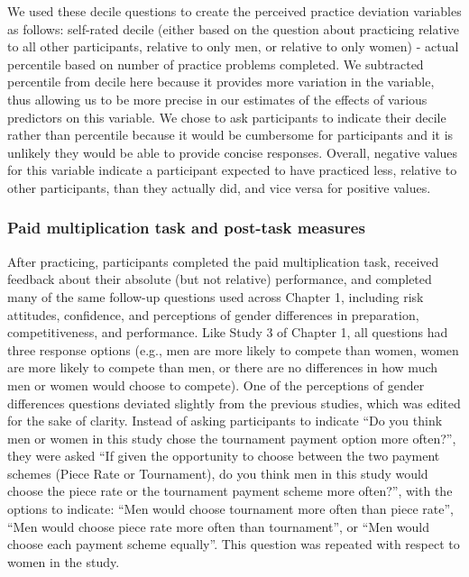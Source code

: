 \documentclass[a4paper, nobind]{templates/ociamthesis}
\begin{document}
We used these decile questions to create the perceived practice deviation variables as follows: self-rated decile (either based on the question about practicing relative to all other participants, relative to only men, or relative to only women) - actual percentile based on number of practice problems completed. We subtracted percentile from decile here because it provides more variation in the variable, thus allowing us to be more precise in our estimates of the effects of various predictors on this variable. We chose to ask participants to indicate their decile rather than percentile because it would be cumbersome for participants and it is unlikely they would be able to provide concise responses. Overall, negative values for this variable indicate a participant expected to have practiced less, relative to other participants, than they actually did, and vice versa for positive values.

\hypertarget{paid-multiplication-task-and-post-task-measures}{%
\subsubsection{Paid multiplication task and post-task measures}\label{paid-multiplication-task-and-post-task-measures}}

After practicing, participants completed the paid multiplication task, received feedback about their absolute (but not relative) performance, and completed many of the same follow-up questions used across Chapter 1, including risk attitudes, confidence, and perceptions of gender differences in preparation, competitiveness, and performance. Like Study 3 of Chapter 1, all questions had three response options (e.g., men are more likely to compete than women, women are more likely to compete than men, or there are no differences in how much men or women would choose to compete). One of the perceptions of gender differences questions deviated slightly from the previous studies, which was edited for the sake of clarity. Instead of asking participants to indicate ``Do you think men or women in this study chose the tournament payment option more often?'', they were asked ``If given the opportunity to choose between the two payment schemes (Piece Rate or Tournament), do you think men in this study would choose the piece rate or the tournament payment scheme more often?'', with the options to indicate: ``Men would choose tournament more often than piece rate'', ``Men would choose piece rate more often than tournament'', or ``Men would choose each payment scheme equally''. This question was repeated with respect to women in the study.
\end{document}
